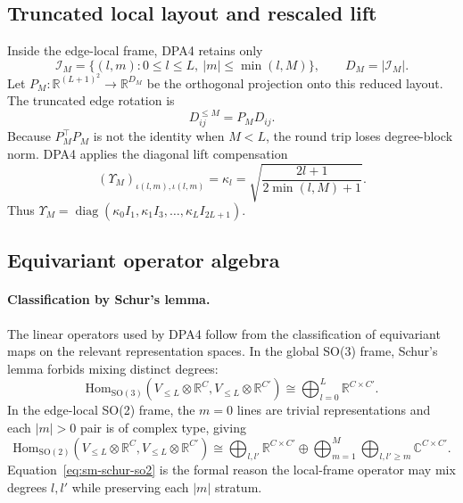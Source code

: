 \subsection{Truncated local layout and rescaled lift}
\label{sec:sm-truncation}

Inside the edge-local frame, DPA4 retains only
\begin{equation}
    \mathcal{I}_M=
    \{(l,m):0\le l\le L,\ |m|\le \min(l,M)\},
    \qquad
    D_M=|\mathcal{I}_M|.
    \label{eq:sm-trunc-index}
\end{equation}
Let $P_M:\mathbb{R}^{(L+1)^2}\to\mathbb{R}^{D_M}$ be the orthogonal projection onto this reduced layout.
The truncated edge rotation is
\begin{equation}
    D_{ij}^{\le M}=P_M D_{ij}.
    \label{eq:sm-truncated-rotation}
\end{equation}
Because $P_M^{\top}P_M$ is not the identity when $M<L$, the round trip loses degree-block norm.
DPA4 applies the diagonal lift compensation
\begin{equation}
    (\Upsilon_M)_{\iota(l,m),\iota(l,m)}
    =
    \kappa_l
    =
    \sqrt{\frac{2l+1}{2\min(l,M)+1}}.
    \label{eq:sm-rescale}
\end{equation}
Thus $\Upsilon_M= \operatorname{diag}(\kappa_0 I_1,\kappa_1 I_3,\ldots,\kappa_L I_{2L+1})$.

\subsection{Equivariant operator algebra}
\label{sec:sm-operators}

\paragraph{Classification by Schur's lemma.}
The linear operators used by DPA4 follow from the classification of equivariant maps on the relevant representation spaces.
In the global
SO(3) frame, Schur's lemma forbids mixing distinct degrees:
\begin{equation}
    \mathrm{Hom}_{\mathrm{SO}(3)}
    (V_{\le L}\otimes\mathbb{R}^{C},V_{\le L}\otimes\mathbb{R}^{C'})
    \cong
    \bigoplus_{l=0}^{L}\mathbb{R}^{C\times C'}.
    \label{eq:sm-schur-so3}
\end{equation}
In the edge-local SO(2) frame, the $m=0$ lines are trivial representations
and each $|m|>0$ pair is of complex type, giving
\begin{equation}
    \mathrm{Hom}_{\mathrm{SO}(2)}
    (V_{\le L}\otimes\mathbb{R}^{C},V_{\le L}\otimes\mathbb{R}^{C'})
    \cong
    \bigoplus_{l,l'}\mathbb{R}^{C\times C'}
    \oplus
    \bigoplus_{m=1}^{M}\bigoplus_{l,l'\ge m}\mathbb{C}^{C\times C'}.
    \label{eq:sm-schur-so2}
\end{equation}
Equation~\eqref{eq:sm-schur-so2} is the formal reason the local-frame operator may mix degrees $l,l'$ while preserving each $|m|$ stratum.


